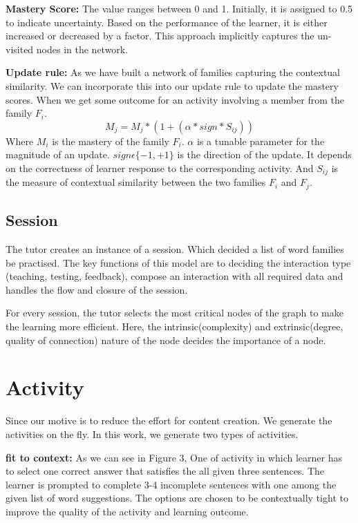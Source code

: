 \documentclass[11pt,a4paper]{article}
\begin{document}
\textbf{Mastery Score:} The value ranges between 0 and 1. Initially, it is
assigned to 0.5 to indicate uncertainty. Based on the performance of the
learner, it is either increased or decreased by a factor. This approach implicitly
captures the un-visited nodes in the network.

\textbf{Update rule:} As we have built a network of families capturing the
contextual similarity. We can incorporate this into our update rule to update
the mastery scores. When we get some outcome for an activity involving a member
from the family ${F_i}$.
\begin{equation}
  M_j = M_j * (1 + (\alpha * sign * S_{ij}))
\end{equation}
Where ${M_i}$ is the mastery of the family ${F_i}$. ${\alpha}$ is a tunable parameter
for the magnitude of an update. ${sign \epsilon  \{-1, +1\}}$ is the direction 
of the update. It depends on the correctness of learner response to the corresponding
activity. And ${S_{ij}}$ is the measure of contextual similarity between the two
families ${F_i}$ and ${F_j}$.

\subsection{Session}
The tutor creates an instance of a session. Which decided a list of word families be practised. The key functions of this model are to deciding the
interaction type (teaching, testing, feedback), compose an interaction with all
required data and handles the flow and closure of the session.

For every session, the tutor selects the most critical nodes of the graph to make the learning more efficient. Here,  the intrinsic(complexity) and extrinsic(degree, quality of connection) nature of the node decides the importance of a node.

\section{Activity}
\label{sec:activity}

Since our motive is to reduce the effort for content creation. We generate the
activities on the fly. In this work, we generate two types of activities. 

\textbf{fit to context:} As we can see in  Figure 3, One of activity in which learner has to select one correct answer that satisfies the all given three sentences. The learner is prompted to complete 3-4 incomplete
sentences with one among the given list of word suggestions. The options are
chosen to be contextually tight to improve the quality of the activity and
learning outcome.
\end{document}
